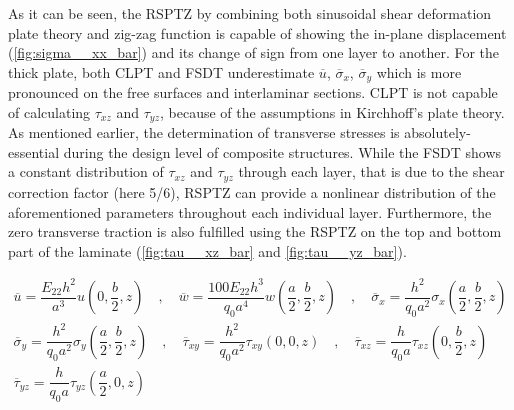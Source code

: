 \documentclass{article}
\begin{document}
As it can be seen, the RSPTZ by combining both sinusoidal shear deformation plate theory and zig-zag function is capable of showing the in-plane displacement (\cref{fig:sigma__xx_bar}) and its change of sign from one layer to another. For the thick plate, both CLPT and FSDT underestimate  $\overline{u}$, $\overline{\sigma}_{x}$, $\overline{\sigma}_{y}$ which is more pronounced on the free surfaces and interlaminar sections. CLPT is not capable of calculating $\tau_{xz}$ and $\tau_{yz}$, because of the assumptions in Kirchhoff's plate theory. As mentioned earlier, the determination of transverse stresses is absolutely-essential during the design level of composite structures. While the FSDT shows a constant distribution of $\tau_{xz}$ and $\tau_{yz}$ through each layer, that is due to the shear correction factor (here 5/6), RSPTZ can provide a nonlinear distribution of the aforementioned parameters throughout each individual layer. Furthermore, the zero transverse traction is also fulfilled using the RSPTZ on the top and bottom part of the laminate (\cref{fig:tau__xz_bar} and \cref{fig:tau__yz_bar}). 

\begin{equation}
\begin{matrix}
    \overline{u} = \dfrac{E_{22} h^2}{a^3} u \left (0, \dfrac{b}{2}, z\right ) \quad, \quad 
    \overline{w} = \dfrac{100 E_{22} h^3}{q_0 a^4} w \left (\dfrac{a}{2}, \dfrac{b}{2}, z\right ) \quad, \quad
    \overline{\sigma}_{x} = \dfrac{h^2}{q_0 a^2} \sigma_{x} \left (\dfrac{a}{2}, \dfrac{b}{2}, z\right )\\
    \overline{\sigma}_{y} = \dfrac{h^2}{q_0 a^2} \sigma_{y} \left (\dfrac{a}{2}, \dfrac{b}{2}, z\right ) \quad, \quad
    \overline{\tau}_{xy} = \dfrac{h^2}{q_0 a^2} \tau_{xy} \left (0, 0, z\right ) \quad, \quad
    \overline{\tau}_{xz} = \dfrac{h}{q_0 a} \tau_{xz} \left (0, \dfrac{b}{2}, z\right )\\
    \overline{\tau}_{yz} = \dfrac{h}{q_0 a} \tau_{yz}\left ( \dfrac{a}{2}, 0, z\right )
\end{matrix}
\label{eq:norm_eqns}
\end{equation}
\end{document}
